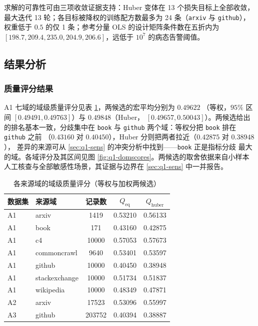 \documentclass[bwprint]{gmcmthesis}
\numberwithin{equation}{section}
\numberwithin{figure}{section}
\numberwithin{table}{section}
\begin{document}
求解的可靠性可由三项收敛证据支持：Huber 变体在 13 个损失目标上全部收敛，最大迭代
13 轮；各目标被降权的训练配方数最多为 24 条（\texttt{arxiv} 与 \texttt{github}），
权重低于 $0.5$ 的仅 1 条；参考分量 OLS 的设计矩阵条件数在五折内为
$[198.7,209.4,235.0,204.9,206.6]$，远低于 $10^7$ 的病态告警阈值。

\subsection{结果分析}

\subsubsection{质量评分结果}\label{sec:q1-scoreres}

A1 七域的域级质量评分见表 \ref{tab:q1-domain}，两候选的宏平均分别为 $0.49622$
（等权，$95\%$ 区间 $[0.49491,0.49763]$）与 $0.49848$（Huber，
$[0.49657,0.50043]$）。两候选给出的排名基本一致，分歧集中在 \texttt{book} 与
\texttt{github} 两个域：等权分把 \texttt{book} 排在 \texttt{github} 之前
（$0.43160$ 对 $0.40450$），Huber 分则把两者拉近（$0.42875$ 对 $0.38948$），
差异的来源可从 \ref{sec:q1-sens} 的冲突分析中找到——\texttt{book} 正是指标分歧
最大的域。各域评分及其区间见图 \ref{fig:q1-domscores}。两候选的取舍依据来自小样本
人工核查与全部敏感性场景，其证据与边界在 \ref{sec:q1-sens} 中一并报告。

\begin{table}[htp!]
\centering
\renewcommand\arraystretch{1.2}
\caption{各来源域的域级质量评分（等权与加权两候选）}\label{tab:q1-domain}
\begin{tabular*}{\textwidth}{@{\extracolsep{\fill}}llccc@{}}
\toprule
数据集 & 来源域 & 记录数 & $Q_{\mathrm{eq}}$ & $Q_{\mathrm{huber}}$ \\
\midrule
A1 & arxiv         & 1419   & 0.53210 & 0.56133 \\
A1 & book          & 171      & 0.43160 & 0.42875 \\
A1 & c4            & 10000  & 0.57053 & 0.57673 \\
A1 & commoncrawl   & 9640   & 0.53401 & 0.53597 \\
A1 & github        & 10000  & 0.40450 & 0.38948 \\
A1 & stackexchange & 10000  & 0.51734 & 0.51837 \\
A1 & wikipedia     & 10000  & 0.48349 & 0.47871 \\
\midrule
A2 & arxiv         & 17523  & 0.53096 & 0.55997 \\
A3 & github        & 203752 & 0.40394 & 0.38887 \\
\bottomrule
\end{tabular*}
\end{table}
\end{document}
